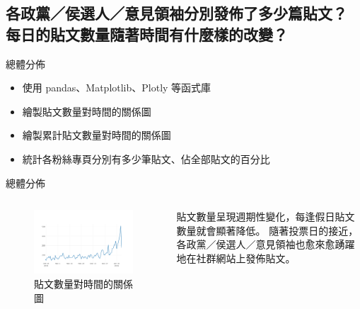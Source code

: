 \documentclass{beamer}
\begin{document}
\begin{CJK}{UTF8}{bkai}
\section{
各政黨／侯選人／意見領袖分別發佈了多少篇貼文？\texorpdfstring{\protect\\}{}
\hspace{.35em}每日的貼文數量隨著時間有什麼樣的改變？
}

\begin{frame}{總體分佈}
\begin{itemize}
\item 使用 pandas、Matplotlib、Plotly 等函式庫
\item 繪製貼文數量對時間的關係圖
\item 繪製累計貼文數量對時間的關係圖
\item 統計各粉絲專頁分別有多少筆貼文、佔全部貼文的百分比
\end{itemize}
\end{frame}

\begin{frame}{總體分佈}
\begin{columns}
\begin{column}{.68\textwidth}
  \begin{figure}
    \includegraphics[width=\textwidth, height=\textheight, keepaspectratio]{quantity_time_graph_ng}
    \caption{貼文數量對時間的關係圖}
  \end{figure}
\end{column}
\begin{column}{.28\textwidth}
  \qquad 貼文數量呈現週期性變化，每逢假日貼文數量就會顯著降低。%
  隨著投票日的接近，各政黨／侯選人／意見領袖也愈來愈踴躍地在社群網站上發佈貼文。%
\end{column}
\end{columns}
\end{frame}


\end{CJK}
\end{document}
